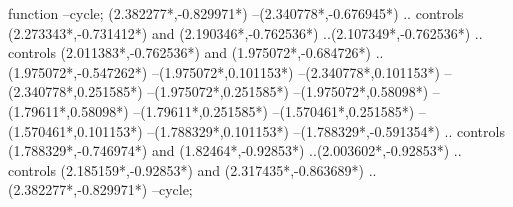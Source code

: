 {\begin{scope}[x=1mm,y=1mm,line width=\SCstroke mm,line cap=round,line join=round]
\begin{SCpart}{function}
--cycle;
 ({2.382277*\SCF},{-0.829971*\SCF})
--({2.340778*\SCF},{-0.676945*\SCF})
.. controls ({2.273343*\SCF},{-0.731412*\SCF}) and ({2.190346*\SCF},{-0.762536*\SCF}) ..({2.107349*\SCF},{-0.762536*\SCF})
.. controls ({2.011383*\SCF},{-0.762536*\SCF}) and ({1.975072*\SCF},{-0.684726*\SCF}) ..({1.975072*\SCF},{-0.547262*\SCF})
--({1.975072*\SCF},{0.101153*\SCF})
--({2.340778*\SCF},{0.101153*\SCF})
--({2.340778*\SCF},{0.251585*\SCF})
--({1.975072*\SCF},{0.251585*\SCF})
--({1.975072*\SCF},{0.58098*\SCF})
--({1.79611*\SCF},{0.58098*\SCF})
--({1.79611*\SCF},{0.251585*\SCF})
--({1.570461*\SCF},{0.251585*\SCF})
--({1.570461*\SCF},{0.101153*\SCF})
--({1.788329*\SCF},{0.101153*\SCF})
--({1.788329*\SCF},{-0.591354*\SCF})
.. controls ({1.788329*\SCF},{-0.746974*\SCF}) and ({1.82464*\SCF},{-0.92853*\SCF}) ..({2.003602*\SCF},{-0.92853*\SCF})
.. controls ({2.185159*\SCF},{-0.92853*\SCF}) and ({2.317435*\SCF},{-0.863689*\SCF}) ..({2.382277*\SCF},{-0.829971*\SCF})
--cycle;
\end{SCpart}
\end{scope}
}
